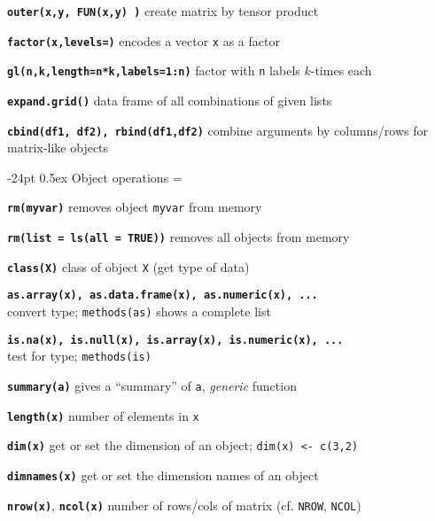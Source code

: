 \documentclass[8pt,landscape]{article}
\makeatletter
\renewcommand\section{\@startsection{section}{1}{0mm}%
                                     {-24pt}%
                                     {0.5ex}%
                                {\color{blue}\normalfont\large\bfseries}}
\newcommand{\code}{\texttt}
\newcommand{\bcode}[1]{\texttt{\textbf{#1}}}
\makeatother
\begin{document}
\begin{multicols*}{3}
\bcode{outer(x,y, FUN(x,y) )} create matrix by tensor product

\bcode{factor(x,levels=)} encodes a vector \code{x} as a factor

\bcode{gl(n,k,length=n*k,labels=1:n)} factor with \code{n} labels $k$-times each

\bcode{expand.grid()} data frame of all combinations of given lists

\bcode{cbind(df1, df2), rbind(df1,df2)} combine arguments by columns/rows for matrix-like objects

\section{Object operations} 
\everypar={\hangindent=9mm}

\bcode{rm(myvar)} removes object \code{myvar} from memory

\bcode{rm(list = ls(all = TRUE))} removes all objects from memory

\bcode{class(X)} class of object \code{X} (get type of data)

\bcode{as.array(x), as.data.frame(x), as.numeric(x), ...} \\
convert type;  \code{methods(as)} shows a complete list
    
\bcode{is.na(x), is.null(x), is.array(x), is.numeric(x), ...}\\
test for type; \code{methods(is)}

\bcode{summary(a)} gives a ``summary'' of \code{a},  \emph{generic} function

\bcode{length(x)}  number of elements in \code{x}

\bcode{dim(x)} get or set the dimension of an object;
\code{dim(x) <- c(3,2)}

\bcode{dimnames(x)} get or set the dimension names of an object

\bcode{nrow(x)}, \bcode{ncol(x)} number of rows/cols of matrix (cf. \code{NROW}, \code{NCOL})








\end{multicols*}
\end{document}
